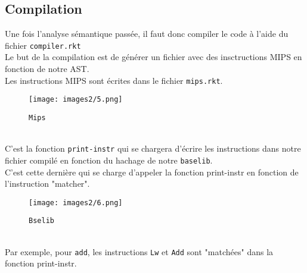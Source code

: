 \documentclass[a4paper,10pt]{article}
\begin{document}
\begin{newpage}
\section{Compilation}
Une fois l'analyse sémantique passée, il faut donc compiler le code à l'aide du fichier {\tt compiler.rkt} \\
Le but de la compilation est de générer un fichier avec des insctructions MIPS en fonction de notre AST.\\
Les instructions MIPS sont écrites dans le fichier {\tt mips.rkt}.

\begin{figure}[h]
\begin{center}
    \texttt{[image: images2/5.png]}
\end{center}
\caption{\label{fig:1}{\tt Mips}}
\end{figure}~\\

C'est la fonction {\tt print-instr} qui se chargera d'écrire les instructions dans notre fichier compilé en fonction du hachage de notre {\tt baselib}.\\
C'est cette dernière qui se charge d'appeler la fonction print-instr en fonction de l'instruction "matcher".

\begin{figure}[h]
\begin{center}
    \texttt{[image: images2/6.png]}
\end{center}
\caption{\label{fig:1}{\tt Bselib}}
\end{figure}~\\

Par exemple, pour {\tt add}, les instructions {\tt Lw} et {\tt Add} sont "matchées" dans la fonction print-instr.

\pagestyle{plain}
\end{newpage}




\end{document}
